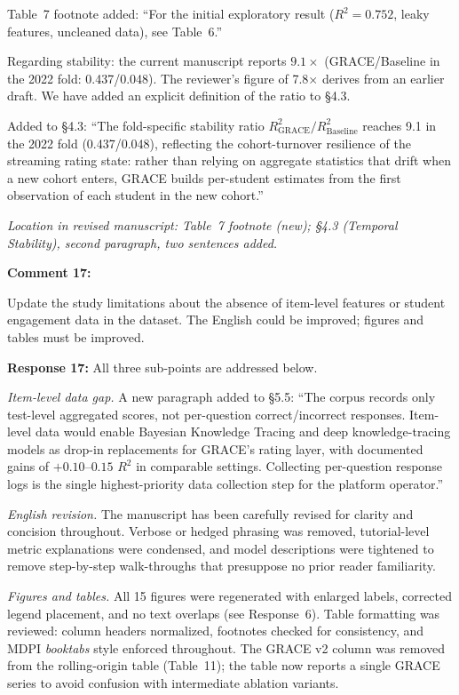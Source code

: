 \documentclass[11pt]{article}
\newcommand{\rev}[1]{{\color{ccolor}#1}}
\begin{document}
\rev{Table~7 footnote added: ``For the initial exploratory result ($R^2 = 0.752$,
leaky features, uncleaned data), see Table~6.''}

\begin{sloppypar}
Regarding stability: the current manuscript reports $9.1\times$ (GRACE/Baseline in the
2022 fold: 0.437/0.048). The reviewer's figure of 7.8$\times$ derives from an earlier
draft. We have added an explicit definition of the ratio to \S4.3.
\end{sloppypar}

\rev{Added to \S4.3: ``The fold-specific stability ratio $R^2_{\text{GRACE}} /
R^2_{\text{Baseline}}$ reaches 9.1 in the 2022 fold (0.437/0.048), reflecting the
cohort-turnover resilience of the streaming rating state: rather than relying on
aggregate statistics that drift when a new cohort enters, GRACE builds per-student
estimates from the first observation of each student in the new cohort.''}

\textit{Location in revised manuscript: Table~7 footnote (new); \S4.3 (Temporal
Stability), second paragraph, two sentences added.}

\bigskip

\textbf{Comment 17:}
\begin{rquote}
Update the study limitations about the absence of item-level features or student
engagement data in the dataset. The English could be improved; figures and tables
must be improved.
\end{rquote}

\textbf{Response 17:}
All three sub-points are addressed below.

\textit{Item-level data gap.}
\rev{A new paragraph added to \S5.5: ``The corpus records only test-level aggregated
scores, not per-question correct/incorrect responses. Item-level data would enable
Bayesian Knowledge Tracing and deep knowledge-tracing models as drop-in replacements
for GRACE's rating layer, with documented gains of $+0.10$--$0.15$ $R^2$ in comparable
settings. Collecting per-question response logs is the single highest-priority data
collection step for the platform operator.''}

\textit{English revision.}
The manuscript has been carefully revised for clarity and concision throughout.
Verbose or hedged phrasing was removed, tutorial-level metric explanations were
condensed, and model descriptions were tightened to remove step-by-step walk-throughs
that presuppose no prior reader familiarity.

\textit{Figures and tables.}
All 15 figures were regenerated with enlarged labels, corrected legend placement,
and no text overlaps (see Response~6). Table formatting was reviewed: column headers
normalized, footnotes checked for consistency, and MDPI \textit{booktabs} style
enforced throughout. The GRACE v2 column was removed from the rolling-origin table
(Table~11); the table now reports a single GRACE series to avoid confusion with
intermediate ablation variants.
\end{document}
